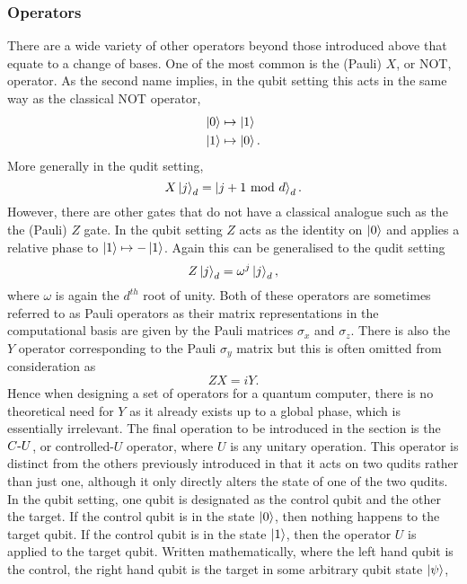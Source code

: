 \subsubsection{Operators}
\label{subsubsection:operators}
There are a wide variety of other operators beyond those introduced above that equate to a change of bases.
One of the most common is the (Pauli) $X$, or NOT, operator.
As the second name implies, in the qubit setting this acts in the same way as the classical NOT operator,
\begin{align}
    \ket{0} &\mapsto \ket{1}\\
    \ket{1} &\mapsto \ket{0}.
\end{align}
More generally in the qudit setting,
\begin{equation}
    X\ket{j}_d = \ket{j + 1 \text{ mod } d}_d.
\end{equation}
However, there are other gates that do not have a classical analogue such as the  the (Pauli) $Z$ gate.
In the qubit setting $Z$ acts as the identity on $\ket{0}$ and applies a relative phase to $\ket{1} \mapsto -\ket{1}$.
Again this can be generalised to the qudit setting
\begin{equation}
    Z\ket{j}_d = \omega^j\ket{j}_d,
\end{equation}
where $\omega$ is again the $d^{th}$ root of unity.
Both of these operators are sometimes referred to as Pauli operators as their matrix representations in the computational basis are given by the Pauli matrices $\sigma_x$ and $\sigma_z$.
There is also the $Y$ operator corresponding to the Pauli $\sigma_y$ matrix but this is often omitted from consideration as
\begin{equation}
    ZX = iY.
\end{equation}
Hence when designing a set of operators for a quantum computer, there is no theoretical need for $Y$ as it already exists up to a global phase, which is essentially irrelevant.
The final operation to be introduced in the section is the $C\text{-}U$, or controlled-$U$ operator, where $U$ is any unitary operation.
This operator is distinct from the others previously introduced in that it acts on two qudits rather than just one, although it only directly alters the state of one of the two qudits.
In the qubit setting, one qubit is designated as the control qubit and the other the target.
If the control qubit is in the state $\ket{0}$, then nothing happens to the target qubit.
If the control qubit is in the state $\ket{1}$, then the operator $U$ is applied to the target qubit.
Written mathematically, where the left hand qubit is the control, the right hand qubit is the target in some arbitrary qubit state $\ket{\psi}$,
